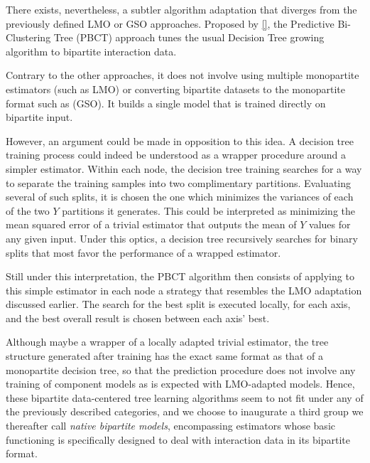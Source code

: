 \documentclass[conference]{IEEEtran}
\begin{document}





\algTrainLocalModel
\algPredictLocalModel

There exists, nevertheless, a subtler algorithm adaptation that diverges from the previously defined LMO or GSO approaches. Proposed by \ref{}, the Predictive Bi-Clustering Tree (PBCT) approach tunes the usual Decision Tree growing algorithm to bipartite interaction data.

Contrary to the other approaches, it does not involve using multiple monopartite estimators (such as LMO) or converting bipartite datasets to the monopartite format such as (GSO). It builds a single model that is trained directly on bipartite input.

However, an argument could be made in opposition to this idea. A decision tree training process could indeed be understood as a wrapper procedure around a simpler estimator. Within each node, the decision tree training searches for a way to separate the training samples into two complimentary partitions. Evaluating several of such splits, it is chosen the one which minimizes the variances of each of the two $Y$ partitions it generates. This could be interpreted as minimizing the mean squared error of a trivial estimator that outputs the mean of $Y$ values for any given input. Under this optics, a decision tree recursively searches for binary splits that most favor the performance of a wrapped estimator.

Still under this interpretation, the PBCT algorithm then consists of applying to this simple estimator in each node a strategy that resembles the LMO adaptation discussed earlier. The search for the best split is executed locally, for each axis, and the best overall result is chosen between each axis' best.

Although maybe a wrapper of a locally adapted trivial estimator, the tree structure generated after training has the exact same format as that of a monopartite decision tree, so that the prediction procedure does not involve any training of component models as is expected with LMO-adapted models. Hence, these bipartite data-centered tree learning algorithms seem to not fit under any of the previously described categories, and we choose to inaugurate a third group we thereafter call \emph{native bipartite models}, encompassing estimators whose basic functioning is specifically designed to deal with interaction data in its bipartite format.
\end{document}
